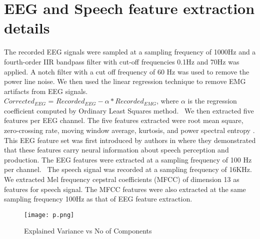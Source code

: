 \documentclass[letterpaper, 10 pt, conference]{ieeeconf}  %
\begin{document}
\section{EEG and Speech feature extraction details}
The recorded EEG signals were sampled at a sampling frequency of 1000Hz and a fourth-order IIR bandpass filter with cut-off frequencies 0.1Hz and 70Hz was applied. A notch filter with a cut off frequency of 60 Hz was used to remove the power line noise. We then used the linear regression technique to remove EMG artifacts from EEG signals. \\${Corrected}_{EEG}$ = ${Recorded}_{EEG} - \alpha \ast {Recorded}_{EMG} $, where $\alpha$ is the regression coefficient computed by Ordinary Least Squares method. 
We then extracted five features per EEG channel. The five features extracted were root mean square, zero-crossing rate, moving window average, kurtosis, and power spectral entropy \cite{krishna2019speech,krishna20}. This EEG feature set was first introduced by authors in \cite{krishna2019speech} where they demonstrated that these features carry neural information about speech perception and production. The EEG features were extracted at a sampling frequency of 100 Hz per channel. 
The speech signal was recorded at a sampling frequency of 16KHz. We extracted Mel frequency cepstral coefficients (MFCC) \cite{vergin1999generalized} of dimension 13 as features for speech signal. The MFCC features were also extracted at the same sampling frequency 100Hz as that of EEG feature extraction. 



\begin{figure}[h]
\begin{center}
\texttt{[image: p.png]}
\caption{Explained Variance vs No of Components} 
\label{1vsall}
\end{center}
\end{figure}
\end{document}

